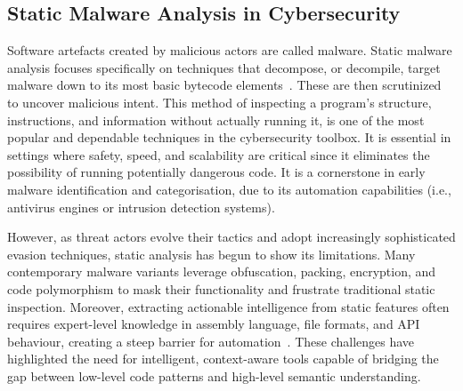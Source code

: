 \subsection{Static Malware Analysis in Cybersecurity}\label{subsec:StaticMalwareAnalysis}
Software artefacts created by malicious actors are called \gls{malware}. Static malware analysis
focuses specifically on techniques that decompose, or \gls{decompile}, target \gls{malware} down to
its most basic bytecode elements~\cite{fedak2020fundamentals,anderson2018ember}. These are then
scrutinized to uncover malicious intent. This method of inspecting a program's structure,
instructions, and information without actually running it, is one of the most popular and
dependable techniques in the cybersecurity toolbox. It is essential in settings where safety,
speed, and scalability are critical since it eliminates the possibility of running potentially
dangerous code. It is a cornerstone in early malware identification and categorisation, due to its
automation capabilities (i.e., antivirus engines or intrusion detection systems).

However, as threat actors evolve their tactics and adopt increasingly sophisticated evasion
techniques, static analysis has begun to show its limitations. Many contemporary malware variants
leverage obfuscation, packing, encryption, and code polymorphism to mask their functionality and
frustrate traditional static inspection. Moreover, extracting actionable intelligence from static
features often requires expert-level knowledge in assembly language, file formats, and API
behaviour, creating a steep barrier for automation~\cite{wong2021practice}. These challenges have
highlighted the need for intelligent, context-aware tools capable of bridging the gap between
low-level code patterns and high-level semantic understanding.

